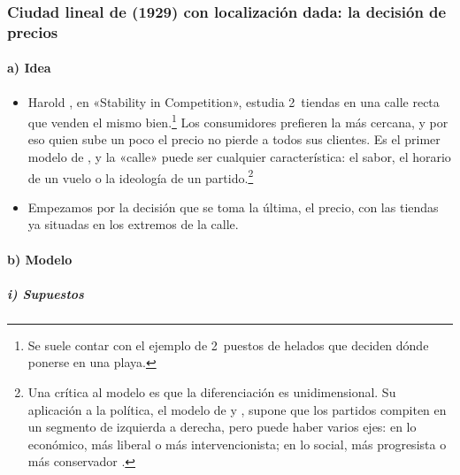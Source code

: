 \documentclass[11pt]{article}
\begin{document}
\subsubsection{Ciudad lineal de  (1929) con localización dada: la decisión de precios}\label{sec:hotelling-precios}

\paragraph{a) Idea}

\begin{itemize}
\item Harold \textcite{Hotelling1929Stability}, en «Stability in Competition», estudia 2~tiendas en una calle recta que venden el mismo bien.\footnote{Se suele contar con el ejemplo de 2~puestos de helados que deciden dónde ponerse en una playa.} Los consumidores prefieren la más cercana, y por eso quien sube un poco el precio no pierde a todos sus clientes. Es el primer modelo de , y la «calle» puede ser cualquier característica: el sabor, el horario de un vuelo o la ideología de un partido.\footnote{Una crítica al modelo es que la diferenciación es unidimensional. Su aplicación a la política, el modelo de  y \nocite{Downs1957Economic}, supone que los partidos compiten en un segmento de izquierda a derecha, pero puede haber varios ejes: en lo económico, más liberal o más intervencionista; en lo social, más progresista o más conservador  .}
\item Empezamos por la decisión que se toma la última, el precio, con las tiendas ya situadas en los extremos de la calle\nocite{Tirole1988Theory}.
\end{itemize}

\paragraph{b) Modelo}

\subparagraph{i) Supuestos}
\end{document}

